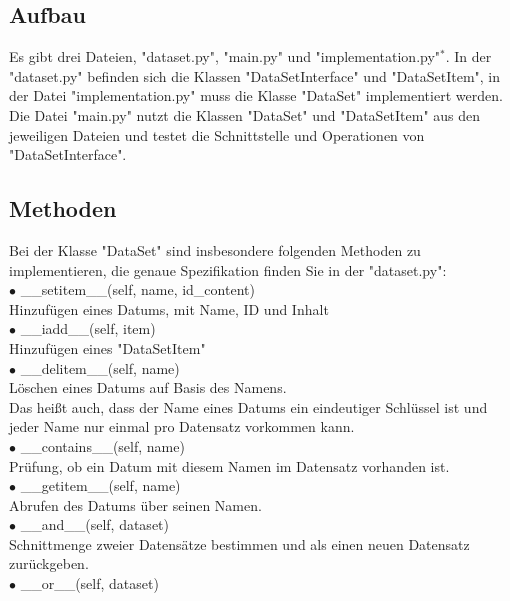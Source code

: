 \documentclass[]{article}
\begin{document}
\subsection{Aufbau}
Es gibt drei Dateien, "dataset.py", "main.py" und "implementation.py"$^*$.
In der "dataset.py" befinden sich die Klassen "DataSetInterface" und "DataSetItem",
in der Datei "implementation.py" muss die Klasse "DataSet" implementiert werden.
Die Datei "main.py" nutzt die Klassen "DataSet" und "DataSetItem" aus den jeweiligen Dateien und testet die Schnittstelle und Operationen von "DataSetInterface".
\subsection{Methoden}
Bei der Klasse "DataSet" sind insbesondere folgenden Methoden zu implementieren, die genaue Spezifikation finden Sie in der "dataset.py":\\
$\bullet$ \_\_setitem\_\_(self, name, id\_content)\\
\hspace*{1cm} Hinzufügen eines Datums, mit Name, ID und Inhalt\\
$\bullet$ \_\_iadd\_\_(self, item)\\
\hspace*{1cm} Hinzufügen eines "DataSetItem"\\
$\bullet$ \_\_delitem\_\_(self, name)\\
\hspace*{1cm} Löschen eines Datums auf Basis des Namens.\\
\hspace*{1cm} Das heißt auch, dass der Name eines Datums ein eindeutiger Schlüssel ist und jeder Name nur einmal pro Datensatz vorkommen kann.\\
$\bullet$ \_\_contains\_\_(self, name)\\
\hspace*{1cm} Prüfung, ob ein Datum mit diesem Namen im Datensatz vorhanden ist.\\
$\bullet$ \_\_getitem\_\_(self, name)\\
\hspace*{1cm} Abrufen des Datums über seinen Namen.\\ 
$\bullet$ \_\_and\_\_(self, dataset)\\
\hspace*{1cm} Schnittmenge zweier Datensätze bestimmen und als einen neuen Datensatz zurückgeben.\\
$\bullet$ \_\_or\_\_(self, dataset)\\
\end{document}
